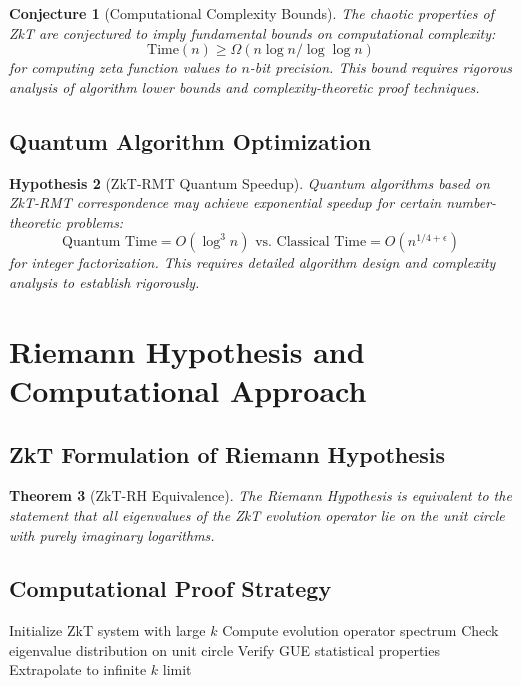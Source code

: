 \documentclass[12pt]{article}
\theoremstyle{plain}
\newtheorem{theorem}{Theorem}[section]
\newtheorem{hypothesis}[theorem]{Hypothesis}
\newtheorem{conjecture}[theorem]{Conjecture}
\theoremstyle{definition}
\begin{document}
\begin{conjecture}[Computational Complexity Bounds]
The chaotic properties of ZkT are conjectured to imply fundamental bounds on computational complexity:
\begin{equation}
\text{Time}(n) \geq \Omega(n \log n / \log \log n)
\end{equation}
for computing zeta function values to $n$-bit precision. This bound requires rigorous analysis of algorithm lower bounds and complexity-theoretic proof techniques.
\end{conjecture}

\subsection{Quantum Algorithm Optimization}

\begin{hypothesis}[ZkT-RMT Quantum Speedup]
Quantum algorithms based on ZkT-RMT correspondence may achieve exponential speedup for certain number-theoretic problems:
\begin{equation}
\text{Quantum Time} = O(\log^3 n) \text{ vs. Classical Time} = O(n^{1/4+\epsilon})
\end{equation}
for integer factorization. This requires detailed algorithm design and complexity analysis to establish rigorously.
\end{hypothesis}

\section{Riemann Hypothesis and Computational Approach}

\subsection{ZkT Formulation of Riemann Hypothesis}

\begin{theorem}[ZkT-RH Equivalence]
The Riemann Hypothesis is equivalent to the statement that all eigenvalues of the ZkT evolution operator lie on the unit circle with purely imaginary logarithms.
\end{theorem}

\subsection{Computational Proof Strategy}

\begin{algorithm}
\caption{ZkT-based RH Verification}
\begin{algorithmic}
\STATE Initialize ZkT system with large $k$
\STATE Compute evolution operator spectrum
\STATE Check eigenvalue distribution on unit circle
\STATE Verify GUE statistical properties
\STATE Extrapolate to infinite $k$ limit
\end{algorithmic}
\end{algorithm}
\end{document}
